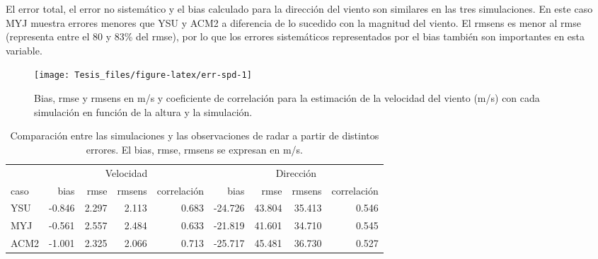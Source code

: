 \documentclass[12pt,spanish,oneside, a4paper]{book}
\begin{document}
El error total, el error no sistemático y el bias calculado para la
dirección del viento son similares en las tres simulaciones. En este
caso MYJ muestra errores menores que YSU y ACM2 a diferencia de lo
sucedido con la magnitud del viento. El rmsens es menor al rmse
(representa entre el 80 y 83\% del rmse), por lo que los errores
sistemáticos representados por el bias también son importantes en esta
variable.

\begin{figure}

{\centering \texttt{[image: Tesis\_files/figure-latex/err-spd-1]} 

}

\caption{Bias, rmse y rmsens en m/s y coeficiente de correlación para la estimación de la velocidad del viento (m/s) con cada simulación en función de la altura y la simulación. \label{err-spd}}\label{fig:err-spd}
\end{figure}

\begin{table}[!h]

\caption{\label{tab:err-tabla}Comparación entre las simulaciones y las observaciones de radar a partir de distintos errores. El bias, rmse, rmsens se expresan en m/s. \label{err}}
\centering
\begin{tabular}[t]{lrrrrrrrr}
\toprule
\multicolumn{1}{c}{ } & \multicolumn{4}{c}{Velocidad} & \multicolumn{4}{c}{Dirección} \\
\cmidrule(l{2pt}r{2pt}){2-5} \cmidrule(l{2pt}r{2pt}){6-9}
caso & bias & rmse & rmsens & correlación & bias & rmse & rmsens & correlación\\
\midrule
YSU & -0.846 & 2.297 & 2.113 & 0.683 & -24.726 & 43.804 & 35.413 & 0.546\\
MYJ & -0.561 & 2.557 & 2.484 & 0.633 & -21.819 & 41.601 & 34.710 & 0.545\\
ACM2 & -1.001 & 2.325 & 2.066 & 0.713 & -25.717 & 45.481 & 36.730 & 0.527\\
\bottomrule
\end{tabular}
\end{table}
\end{document}

